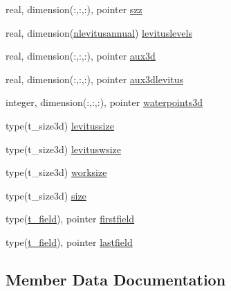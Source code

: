 \begin{DoxyCompactItemize}
\item 
real, dimension(\+:,\+:,\+:), pointer \mbox{\hyperlink{structmodulelevitusformat_1_1t__levitusformat_a7a48304f6cca41f322761efc0e1f941e}{szz}}
\item 
real, dimension(\mbox{\hyperlink{namespacemodulelevitusformat_a3edc6e1738bc17572f3b07705f142bd4}{nlevitusannual}}) \mbox{\hyperlink{structmodulelevitusformat_1_1t__levitusformat_a8ca4efdf49b1446c8d34d1d828433171}{levituslevels}}
\item 
real, dimension(\+:,\+:,\+:), pointer \mbox{\hyperlink{structmodulelevitusformat_1_1t__levitusformat_a6d4e4babbf0eb1b1638709f711513b92}{aux3d}}
\item 
real, dimension(\+:,\+:,\+:), pointer \mbox{\hyperlink{structmodulelevitusformat_1_1t__levitusformat_a85c675bcfdfea446357e1fdb5c0d79cb}{aux3dlevitus}}
\item 
integer, dimension(\+:,\+:,\+:), pointer \mbox{\hyperlink{structmodulelevitusformat_1_1t__levitusformat_a56d5865fc9bd6620076538b2fd06cbd5}{waterpoints3d}}
\item 
type(t\+\_\+size3d) \mbox{\hyperlink{structmodulelevitusformat_1_1t__levitusformat_afc91492ebeea4df8c58d3fcb3deac62f}{levitussize}}
\item 
type(t\+\_\+size3d) \mbox{\hyperlink{structmodulelevitusformat_1_1t__levitusformat_a92e6ac7fce55192bd06d735c49d02910}{levituswsize}}
\item 
type(t\+\_\+size3d) \mbox{\hyperlink{structmodulelevitusformat_1_1t__levitusformat_a6717f054e64943f808f2a310e4479197}{worksize}}
\item 
type(t\+\_\+size3d) \mbox{\hyperlink{structmodulelevitusformat_1_1t__levitusformat_a1ae3cda60ca95cbf8df9687ba3baace7}{size}}
\item 
type(\mbox{\hyperlink{structmodulelevitusformat_1_1t__field}{t\+\_\+field}}), pointer \mbox{\hyperlink{structmodulelevitusformat_1_1t__levitusformat_a396c3a12041852868d5684689e109aa8}{firstfield}}
\item 
type(\mbox{\hyperlink{structmodulelevitusformat_1_1t__field}{t\+\_\+field}}), pointer \mbox{\hyperlink{structmodulelevitusformat_1_1t__levitusformat_acf0b82915ded34235de8731bb0d7fa77}{lastfield}}
\end{DoxyCompactItemize}


\subsection{Member Data Documentation}
\mbox{\label{structmodulelevitusformat_1_1t__levitusformat_a6d4e4babbf0eb1b1638709f711513b92}} 
